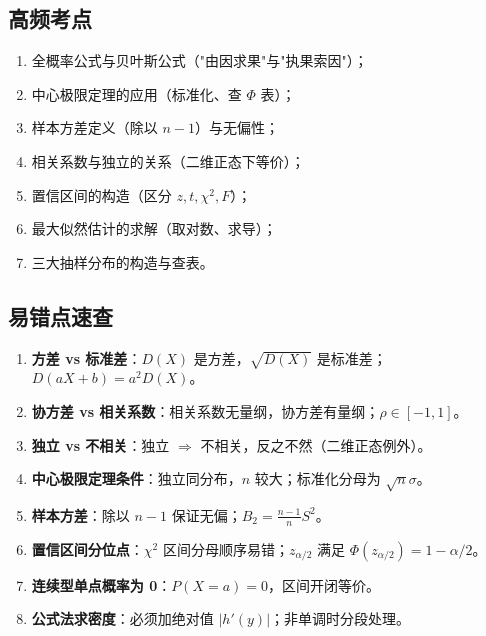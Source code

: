 \documentclass[11pt,a4paper]{article}
\begin{document}
\subsection*{高频考点}
\begin{enumerate}[leftmargin=2em]
  \item 全概率公式与贝叶斯公式（"由因求果"与"执果索因"）；
  \item 中心极限定理的应用（标准化、查 $\Phi$ 表）；
  \item 样本方差定义（除以 $n-1$）与无偏性；
  \item 相关系数与独立的关系（二维正态下等价）；
  \item 置信区间的构造（区分 $z,t,\chi^2,F$）；
  \item 最大似然估计的求解（取对数、求导）；
  \item 三大抽样分布的构造与查表。
\end{enumerate}

\subsection*{易错点速查}
\begin{enumerate}[leftmargin=2em]
  \item \textbf{方差 vs 标准差}：$D(X)$ 是方差，$\sqrt{D(X)}$ 是标准差；$D(aX+b)=a^2 D(X)$。
  \item \textbf{协方差 vs 相关系数}：相关系数无量纲，协方差有量纲；$\rho\in[-1,1]$。
  \item \textbf{独立 vs 不相关}：独立 $\Rightarrow$ 不相关，反之不然（二维正态例外）。
  \item \textbf{中心极限定理条件}：独立同分布，$n$ 较大；标准化分母为 $\sqrt n\sigma$。
  \item \textbf{样本方差}：除以 $n-1$ 保证无偏；$B_2=\frac{n-1}{n}S^2$。
  \item \textbf{置信区间分位点}：$\chi^2$ 区间分母顺序易错；$z_{\alpha/2}$ 满足 $\Phi(z_{\alpha/2})=1-\alpha/2$。
  \item \textbf{连续型单点概率为 0}：$P(X=a)=0$，区间开闭等价。
  \item \textbf{公式法求密度}：必须加绝对值 $|h'(y)|$；非单调时分段处理。
\end{enumerate}
\end{document}
